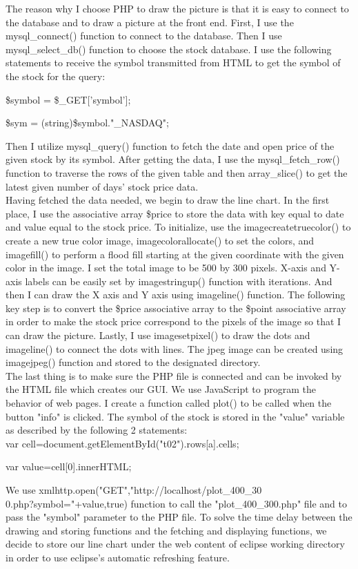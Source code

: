 \documentclass[10pt, conference, compsocconf]{IEEEtran}
\begin{document}
\begin{enumerate}[label=\Alph*]
The reason why I choose PHP to draw the picture is that it is easy to connect to the database and to draw a picture at the front end. First, I use the mysql\_connect() function to connect to the database. Then I use mysql\_select\_db() function to choose the stock database. I use the following statements to receive the symbol transmitted from HTML to get the symbol of the stock for the query: 


\$symbol = \$\_GET['symbol'];

\$sym = (string)\$symbol."\_NASDAQ";

Then I utilize mysql\_query() function to fetch the date and open price of the given stock by its symbol. After getting the data, I use the mysql\_fetch\_row() function to traverse the rows of the given table and then array\_slice() to get the latest given number of days' stock price data.\\


Having fetched the data needed, we begin to draw the line chart. In the first place, I use the associative array \$price to store the data with key equal to date and value equal to the stock price. 
To initialize, use the imagecreatetruecolor() to create a new true color image, imagecolorallocate() to set the colors, and imagefill() to perform a flood fill starting at the given coordinate with the given color in the image. I set the total image to be 500 by 300 pixels. X-axis and Y-axis labels can be easily set by imagestringup() function with iterations. And then I can draw the X axis and Y axis using imageline() function. The following key step is to convert the \$price associative array to the \$point associative array in order to make the stock price correspond to the pixels of the image so that I can draw the picture. Lastly, I use imagesetpixel() to draw the dots and imageline() to connect the dots with lines. The jpeg image can be created using imagejpeg() function and stored to the designated directory. \\


The last thing is to make sure the PHP file is connected and can be invoked by the HTML file which creates our GUI. We use JavaScript to program the behavior of web pages. I create a function called  plot() to be called when the button "info" is clicked. The symbol of the stock is stored in the "value" variable as described by the following 2 statements:\\


var cell=document.getElementById("t02").rows[a].cells;

var value=cell[0].innerHTML;

We use xmlhttp.open("GET","http://localhost/plot\_400\_30\\0.php?symbol="+value,true) function to call the "plot\_400\_300.php" file and to pass the "symbol" parameter to the PHP file. To solve the time delay between the drawing and storing functions and the fetching and displaying functions, we decide to store our line chart under the web content of eclipse working directory in order to use eclipse's automatic refreshing feature. \\
   
   
\end{enumerate}
\end{document}
